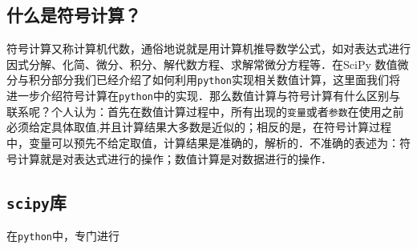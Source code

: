 
\subsection{什么是符号计算？}
符号计算又称计算机代数，通俗地说就是用计算机推导数学公式，如对表达式进行因式分解、化简、微分、积分、解代数方程、求解常微分方程等．在SciPy 数值微分与积分部分我们已经介绍了如何利用\verb|python|实现相关数值计算，这里面我们将进一步介绍符号计算在\verb|python|中的实现．那么数值计算与符号计算有什么区别与联系呢？个人认为：首先在数值计算过程中，所有出现的\verb|变量|或者\verb|参数|在使用之前必须给定具体取值,并且计算结果大多数是近似的；相反的是，在符号计算过程中，变量可以预先不给定取值，计算结果是准确的，解析的．不准确的表述为：符号计算就是对表达式进行的操作；数值计算是对数据进行的操作．

\subsection{\verb|scipy|库}
在\verb|python|中，专门进行